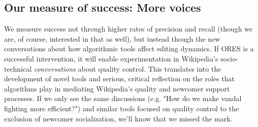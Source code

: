 \subsection{Our measure of success: More voices}
We measure success not through higher rates of precision and recall (though we are, of course, interested in that as well), but instead though the new conversations about how algorithmic tools affect editing dynamics.  If ORES is a successful intervention, it will enable experimentation in Wikipedia's socio-technical \emph{conversations} about quality control.  This translates into the development of novel tools and serious, critical reflection on the roles that algorithms play in mediating Wikipedia's quality and newcomer support processes. If we only see the same discussions (e.g. "How do we make vandal fighting more efficient?") and similar tools focused on quality control to the exclusion of newcomer socialization, we'll know that we missed the mark.
